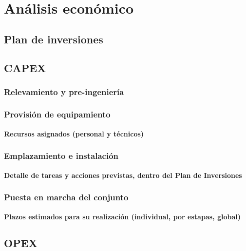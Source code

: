 \documentclass[10pt,a4paper]{report}
\begin{document}
\chapter{Análisis económico}

\section{Plan de inversiones}

\section{CAPEX}

\subsection{Relevamiento y pre-ingeniería}

\subsection{Provisión de equipamiento}

\subsubsection{Recursos asignados (personal y técnicos)}

\subsection{Emplazamiento e instalación}

\subsubsection{Detalle de tareas y acciones previstas, dentro del Plan de Inversiones}

\subsection{Puesta en marcha del conjunto}

\subsubsection{Plazos estimados para su realización (individual, por estapas, global)}

\section{OPEX}
\end{document}
